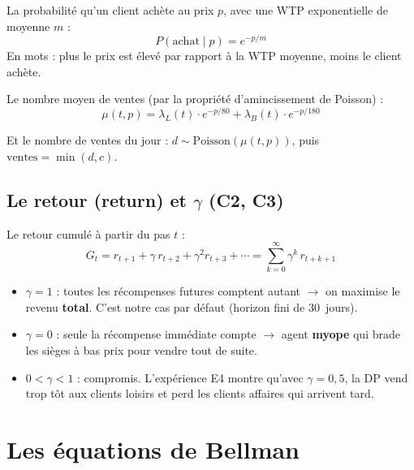 \documentclass[11pt,a4paper]{article}
\begin{document}
La probabilité qu'un client achète au prix $p$, avec une WTP exponentielle de moyenne $m$ :
\begin{equation}
\boxed{P(\text{achat} \mid p) = e^{-p/m}}
\label{eq:purchase}
\end{equation}
En mots : plus le prix est élevé par rapport à la WTP moyenne, moins le client achète.

Le nombre moyen de ventes (par la propriété d'amincissement de Poisson) :
\begin{equation}
\boxed{\mu(t, p) = \lambda_L(t) \cdot e^{-p/80} + \lambda_B(t) \cdot e^{-p/180}}
\label{eq:demand}
\end{equation}

Et le nombre de ventes du jour : $d \sim \text{Poisson}(\mu(t,p))$, puis $\text{ventes} = \min(d, c)$.

\subsection{Le retour (return) et $\gamma$ (C2, C3)}

Le retour cumulé à partir du pas $t$ :
\begin{equation}
G_t = r_{t+1} + \gamma\, r_{t+2} + \gamma^2 r_{t+3} + \cdots = \sum_{k=0}^{\infty} \gamma^k\, r_{t+k+1}
\end{equation}

\begin{defbox}
\begin{itemize}[nosep]
  \item $\gamma = 1$ : toutes les récompenses futures comptent autant $\to$ on maximise le revenu \textbf{total}. C'est notre cas par défaut (horizon fini de 30~jours).
  \item $\gamma = 0$ : seule la récompense immédiate compte $\to$ agent \textbf{myope} qui brade les sièges à bas prix pour vendre tout de suite.
  \item $0 < \gamma < 1$ : compromis. L'expérience E4 montre qu'avec $\gamma = 0{,}5$, la DP vend trop tôt aux clients loisirs et perd les clients affaires qui arrivent tard.
\end{itemize}
\end{defbox}

\section{Les équations de Bellman}
\label{sec:bellman}
\end{document}
